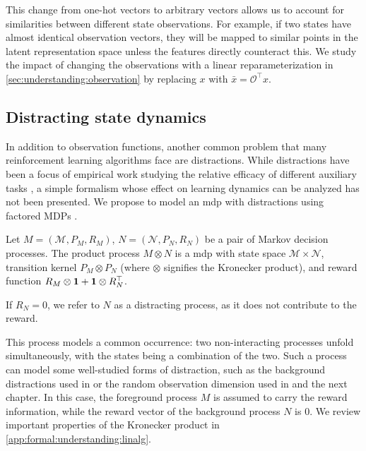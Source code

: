This change from one-hot vectors to arbitrary vectors allows us to account for similarities between different state observations.
For example, if two states have almost identical observation vectors, they will be mapped to similar points in the latent representation space unless the features directly counteract this.
We study the impact of changing the observations with a linear reparameterization in \autoref{sec:understanding:observation} by replacing $x$ with $\bar{x} = \mathcal{O}^\top x$.


\subsection{Distracting state dynamics}
In addition to observation functions, another common problem that many reinforcement learning algorithms face are distractions.
While distractions have been a focus of empirical work studying the relative efficacy of different auxiliary tasks \parencite{ni2024bridging}, a simple formalism whose effect on learning dynamics can be analyzed has not been presented. 
We propose to model an \ac{mdp}  with distractions using factored MDPs \parencite{boutilier2000stochastic}.

\begin{definition}\label{def:distracting}
Let $M=(\mathcal{M}, P_{M},R_M)$,  $N=(\mathcal{N},P_N,R_N)$ be a pair of Markov decision processes.
The product process $M \otimes N$ is a \ac{mdp}  with state space $\mathcal{M}\times \mathcal{N}$, transition kernel $P_M\otimes P_N$ (where $\otimes$ signifies the Kronecker product), and reward function $R_M\otimes {\bm{1}} +{\bm{1}} \otimes R_N^\top$.

If $R_N = 0$, we refer to $N$ as a distracting process, as it does not contribute to the reward.
\end{definition}

This process models a common occurrence: two non-interacting processes unfold simultaneously, with the states being a combination of the two.
Such a process can model some well-studied forms of distraction, such as the background distractions used in \textcite{stone2021thedc} or the random observation dimension used in \textcite{nikishin2021control} and the next chapter.
In this case, the foreground process $M$ is assumed to carry the reward information, while the reward vector of the background process $N$ is 0.
We review important properties of the Kronecker product in \autoref{app:formal:understanding:linalg}.


